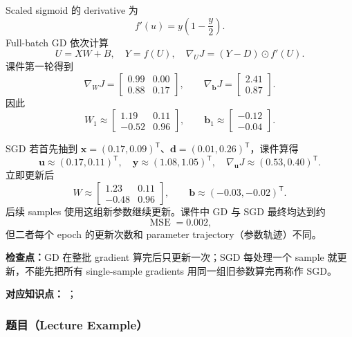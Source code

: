 \begin{checkedsolution}
Scaled sigmoid 的 derivative 为
\[
  f'(u)=y\left(1-\frac y2\right).
\]
Full-batch GD 依次计算
\[
  U=XW+B,
  \quad Y=f(U),
  \quad \nabla_UJ=(Y-D)\odot f'(U).
\]
课件第一轮得到
\[
  \nabla_WJ=
  \begin{bmatrix}0.99&0.00\\0.88&0.17\end{bmatrix},
  \qquad
  \nabla_{\bm b}J=
  \begin{bmatrix}2.41\\0.87\end{bmatrix}.
\]
因此
\[
  \boxed{W_1\approx
  \begin{bmatrix}1.19&0.11\\-0.52&0.96\end{bmatrix}},
  \qquad
  \boxed{\bm b_1\approx
  \begin{bmatrix}-0.12\\-0.04\end{bmatrix}}.
\]

SGD 若首先抽到 $\bm x=(0.17,0.09)^{\mathsf T}$、$\bm d=(0.01,0.26)^{\mathsf T}$，课件算得
\[
  \bm u\approx(0.17,0.11)^{\mathsf T},
  \quad
  \bm y\approx(1.08,1.05)^{\mathsf T},
  \quad
  \nabla_{\bm u}J\approx(0.53,0.40)^{\mathsf T}.
\]
立即更新后
\[
  W\approx
  \begin{bmatrix}1.23&0.11\\-0.48&0.96\end{bmatrix},
  \qquad
  \bm b\approx(-0.03,-0.02)^{\mathsf T}.
\]
后续 samples 使用这组新参数继续更新。课件中 GD 与 SGD 最终均达到约
\[
  \boxed{\operatorname{MSE}=0.002},
\]
但二者每个 epoch 的更新次数和 parameter trajectory（参数轨迹）不同。
\end{checkedsolution}

\textbf{检查点：}GD 在整批 gradient 算完后只更新一次；SGD 每处理一个 sample 就更新，不能先把所有 single-sample gradients 用同一组旧参数算完再称作 SGD。


\textbf{对应知识点：}
；

\subsubsection*{题目（Lecture Example）}

